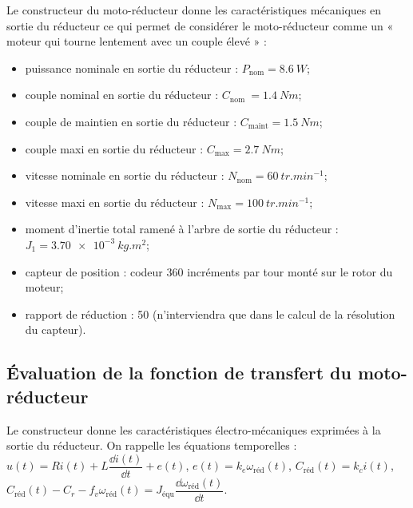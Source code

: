 Le constructeur du moto-réducteur donne les caractéristiques mécaniques en sortie du réducteur  ce qui permet de considérer le moto-réducteur comme un « moteur qui tourne lentement avec un couple élevé » :
\begin{itemize}
\item puissance nominale en sortie du réducteur : $P_{\text{nom}} = \SI{8,6}{W}$;
\item couple nominal en sortie du réducteur : $C_{\text{nom }} = \SI{1,4}{Nm}$;  
\item couple de maintien en sortie du réducteur : $C_{\text{maint}} = \SI{1,5}{Nm}$;
\item couple maxi en sortie du réducteur : $C_{\text{max}}	= \SI{2,7}{Nm}$;
\item vitesse nominale en sortie du réducteur : $N_{\text{nom}} = \SI{60}{tr.min^{-1}}$;
\item vitesse maxi en sortie du réducteur : $N_{\text{max}} = \SI{100}{tr.min^{-1}}$;
\item moment d’inertie total ramené à l’arbre de sortie du réducteur : $J_1 = \SI{3,70e-3}{kg.m^2}$; 
\item capteur de position : codeur 360 incréments par tour monté sur le rotor du moteur;
\item rapport de réduction : 50 (n’interviendra que dans le calcul de la résolution du capteur).
\end{itemize}
\fi

\subsection*{Évaluation de la fonction de transfert du moto-réducteur}
\ifprof
\else
Le constructeur donne les caractéristiques électro-mécaniques exprimées à la sortie du réducteur.
On rappelle les équations temporelles :
$u(t) = R i(t) + L \dfrac{\dd i(t)}{\dd t} + e(t)$, $e(t) = k_e  \omega_{\text{réd}}(t)$, 
$C_{\text{réd}} (t)= k_c  i(t)$, $C_{\text{réd}} (t) - C_r - f_v \omega_{\text{réd}}(t)= J_{\text{équ}} \dfrac{\dd \omega_{\text{réd}}(t)}{\dd t}$. 

